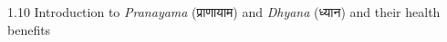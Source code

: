 








\begin{frame}[fragile]\frametitle{}
\begin{center}
{\Large 1.10 Introduction to \textit{Pranayama} (प्राणायाम) and \textit{Dhyana} (ध्यान) and their health benefits}
\end{center}
\end{frame}

